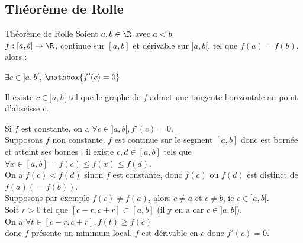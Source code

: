 \documentclass[12pt,a4paper]{report}
\begin{document}
\subsection{Théorème de Rolle}

\begin{theoreme}{Théorème de Rolle}{}
Soient $a,b\in \R$ avec $a<b$\\
$f:[a,b]\to \R$, continue sur $[a,b]$ et dérivable sur $]a,b[$, tel que $f(a)=f(b)$, alors :
\begin{center}
    $\exists c \in ]a,b[$, $\mathbox{f'(c)=0}$
\end{center}
\end{theoreme}

\begin{remarque}[Interprétation]
\begin{center}
\end{center}

Il existe $c \in ]a,b[$ tel que le graphe de $f$ admet une tangente horizontale au point d'abscisse $c$.
\end{remarque}

\begin{demo}{}
Si $f$ est constante, on a $\forall c \in ]a,b[, f'(c) = 0$. \\
Supposons $f$ non constante. $f$ est continue sur le segment $[a,b]$ donc est bornée et atteint ses bornes : il existe $c,d \in [a,b]$ tels que $\forall x \in [a,b] = f(c) \leq f(x) \leq f(d)$. \\
On a $f(c) < f(d)$ sinon $f$ est constante, donc $f(c)$ ou $f(d)$ est distinct de $f(a) (=f(b))$. \\
Supposons par exemple $f(c) \neq f(a)$, alors $c \neq a$ et $c \neq b$, ie $c \in ]a,b[$. \\
Soit $r>0$ tel que $[c-r,c+r] \subset [a,b]$ (il y en a car $c \in ]a,b[$). \\
On a $\forall t \in [c-r,c+r], f(t) \geq f(c)$ \\
donc $f$ présente un minimum local. $f$ est dérivable en $c$ donc $f'(c) = 0$.
\end{demo}
\end{document}
